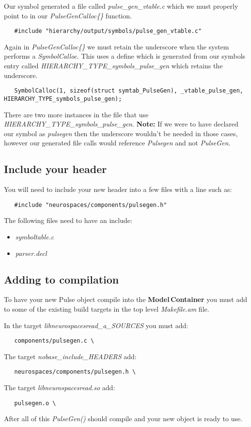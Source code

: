 \documentclass[12pt]{article}
\begin{document}
Our symbol generated a file called {\it pulse\_gen\_vtable.c} which we must properly point to in our {\it PulseGenCalloc\{\}} function.
\begin{verbatim}
   #include "hierarchy/output/symbols/pulse_gen_vtable.c"
\end{verbatim}
Again in {\it PulseGenCalloc\{\}} we must retain the underscore when the system performs a {\it SymbolCalloc}. This uses a define which is generated from our symbols entry called {\it HIERARCHY\_TYPE\_symbols\_pulse\_gen} which retains the underscore.
\begin{verbatim}
   SymbolCalloc(1, sizeof(struct symtab_PulseGen), _vtable_pulse_gen, HIERARCHY_TYPE_symbols_pulse_gen);
\end{verbatim}
There are two more instances in the file that use {\it HIERARCHY\_TYPE\_symbols\_pulse\_gen}. {\bf Note:} If we were to have declared our symbol as {\it pulsegen} then the underscore wouldn't be needed in those cases, however our generated file calls would reference {\it Pulsegen} and not {\it PulseGen}.

\subsection*{Include your header}

You will need to include your new header into a few files with a line such as:
\begin{verbatim}
   #include "neurospaces/components/pulsegen.h"
\end{verbatim}
The following files need to have an include:
\begin{itemize}
   \item[]{\it symboltable.c}
   \item[]{\it parser.decl}
\end{itemize}

\subsection*{Adding to compilation}

To have your new Pulse object compile into the {\bf Model\,Container} you must add to some of the existing build targets in the top level {\it Makefile.am} file.

In the target {\it libneurospacesread\_a\_SOURCES} you must add:
\begin{verbatim}
   components/pulsegen.c \
\end{verbatim}
The target {\it nobase\_include\_HEADERS} add:
\begin{verbatim}
   neurospaces/components/pulsegen.h \
\end{verbatim}
The target {\it libneurospacesread.so} add:
\begin{verbatim}
   pulsegen.o \
\end{verbatim}
After all of this {\it PulseGen()} should compile and your new object is ready to use.
\end{document}
